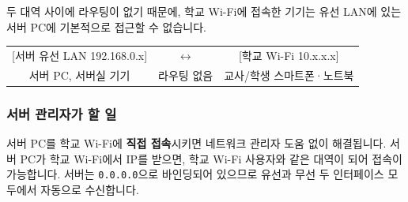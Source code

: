 \documentclass[a4paper,12pt]{article}
\begin{document}
두 대역 사이에 라우팅이 없기 때문에, 학교 Wi-Fi에 접속한 기기는
유선 LAN에 있는 서버 PC에 기본적으로 접근할 수 없습니다.

\begin{center}
\ttfamily\small
\begin{tabular}{ccc}
[서버 유선 LAN 192.168.0.x] & $\longleftrightarrow$ & [학교 Wi-Fi 10.x.x.x] \\
서버 PC, 서버실 기기 & \textcolor{danger}{라우팅 없음} & 교사/학생 스마트폰·노트북 \\
\end{tabular}
\end{center}

\subsubsection{서버 관리자가 할 일}

서버 PC를 학교 Wi-Fi에 \textbf{직접 접속}시키면 네트워크 관리자 도움 없이 해결됩니다.
서버 PC가 학교 Wi-Fi에서 IP를 받으면, 학교 Wi-Fi 사용자와 같은 대역이 되어 접속이 가능합니다.
서버는 \texttt{0.0.0.0}으로 바인딩되어 있으므로 유선과 무선 두 인터페이스 모두에서 자동으로 수신합니다.
\end{document}
